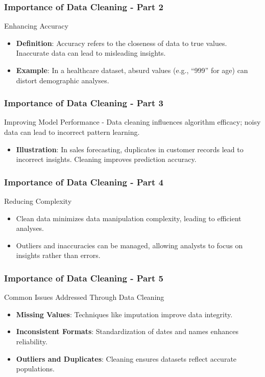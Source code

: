 \documentclass[aspectratio=169]{beamer}
\begin{document}
\begin{frame}[fragile]
    \frametitle{Importance of Data Cleaning - Part 2}
    \begin{block}{Enhancing Accuracy}
        \begin{itemize}
            \item \textbf{Definition}: Accuracy refers to the closeness of data to true values. Inaccurate data can lead to misleading insights.
            \item \textbf{Example}: In a healthcare dataset, absurd values (e.g., “999” for age) can distort demographic analyses.
        \end{itemize}
    \end{block}
\end{frame}

\begin{frame}[fragile]
    \frametitle{Importance of Data Cleaning - Part 3}
    \begin{block}{Improving Model Performance}
        - Data cleaning influences algorithm efficacy; noisy data can lead to incorrect pattern learning.
        
        \begin{itemize}
            \item \textbf{Illustration}: In sales forecasting, duplicates in customer records lead to incorrect insights. Cleaning improves prediction accuracy.
        \end{itemize}
    \end{block}
\end{frame}

\begin{frame}[fragile]
    \frametitle{Importance of Data Cleaning - Part 4}
    \begin{block}{Reducing Complexity}
        \begin{itemize}
            \item Clean data minimizes data manipulation complexity, leading to efficient analyses.
            \item Outliers and inaccuracies can be managed, allowing analysts to focus on insights rather than errors.
        \end{itemize}
    \end{block}
\end{frame}

\begin{frame}[fragile]
    \frametitle{Importance of Data Cleaning - Part 5}
    \begin{block}{Common Issues Addressed Through Data Cleaning}
        \begin{itemize}
            \item \textbf{Missing Values}: Techniques like imputation improve data integrity.
            \item \textbf{Inconsistent Formats}: Standardization of dates and names enhances reliability.
            \item \textbf{Outliers and Duplicates}: Cleaning ensures datasets reflect accurate populations.
        \end{itemize}
    \end{block}
\end{frame}
\end{document}
